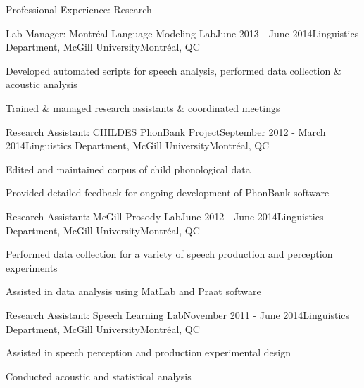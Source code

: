 \documentclass{resume} %
\begin{document}
\begin{rSection}{Professional Experience: Research}
	
	\begin{rSubsection}{Lab Manager: Montr\'eal Language Modeling Lab}{June 2013 - June 2014}{Linguistics Department, McGill University}{Montr\'eal, QC}
	\item Developed automated scripts for speech analysis, performed data collection \& acoustic analysis
	\item Trained \& managed research assistants \& coordinated meetings
	\end{rSubsection}
	
	
	\begin{rSubsection}{Research Assistant: CHILDES PhonBank Project}{September 2012 - March 2014}{Linguistics Department, McGill University}{Montr\'eal, QC}
	\item Edited and maintained corpus of child phonological data
	\item Provided detailed feedback for ongoing development of PhonBank software
	\end{rSubsection}
	
	
	\begin{rSubsection}{Research Assistant: McGill Prosody Lab}{June 2012 - June 2014}{Linguistics Department, McGill University}{Montr\'eal, QC}
	\item Performed data collection for a variety of speech production and perception experiments
	\item Assisted in data analysis using MatLab and Praat software
	\end{rSubsection}
	
	
	\begin{rSubsection}{Research Assistant: Speech Learning Lab}{November 2011 - June 2014}{Linguistics Department, McGill University}{Montr\'eal, QC}
	\item Assisted in speech perception and production experimental design
	\item Conducted acoustic and statistical analysis
	\end{rSubsection}

\end{rSection}

\end{document}
